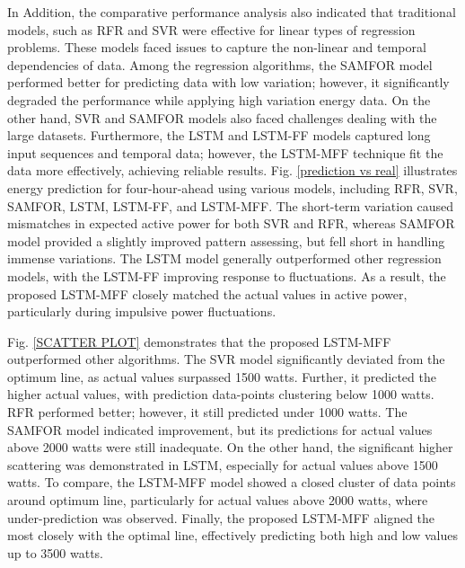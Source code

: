 \documentclass[journal]{IEEEtran}
\begin{document}
 
 In Addition, the comparative performance analysis also indicated that traditional models, such as RFR and SVR were effective for linear types of regression problems. These models faced issues to capture the non-linear and temporal dependencies of data. 
 Among the regression algorithms, the SAMFOR model performed better for predicting data with low variation; however, it significantly degraded the performance while applying high variation energy data. On the other hand, SVR and SAMFOR models also faced challenges dealing with the large datasets. Furthermore, the LSTM and LSTM-FF models captured long input sequences and temporal data; however, the LSTM-MFF technique fit the data more effectively, achieving reliable results. 
  Fig. \ref{prediction vs real} illustrates energy prediction for four-hour-ahead using various models, including RFR, SVR, SAMFOR, LSTM, LSTM-FF, and LSTM-MFF. The short-term variation caused mismatches in expected active power for both SVR and RFR, whereas SAMFOR model provided a slightly improved pattern assessing, but fell short in handling immense variations. The LSTM model generally outperformed other regression models, with the LSTM-FF improving response to fluctuations. As a result, the proposed LSTM-MFF closely matched the actual values in active power, particularly during impulsive power fluctuations.
 
   Fig. \ref{SCATTER PLOT} demonstrates that the proposed LSTM-MFF outperformed other algorithms. The SVR model significantly deviated from the optimum line, as actual values surpassed 1500 watts. Further, it predicted the higher actual values, with prediction data-points clustering below 1000 watts. RFR performed better; however, it still predicted under 1000 watts. The SAMFOR model indicated improvement, but its predictions for actual values above 2000 watts were still inadequate. On the other hand, the significant higher scattering was demonstrated in LSTM, especially for actual values above 1500 watts. To compare, the LSTM-MFF model showed a closed cluster of data points around optimum line, particularly for actual values above 2000 watts, where under-prediction was observed. Finally, the proposed LSTM-MFF aligned the most closely with the optimal line, effectively predicting both high and low values up to 3500 watts.
\end{document}
